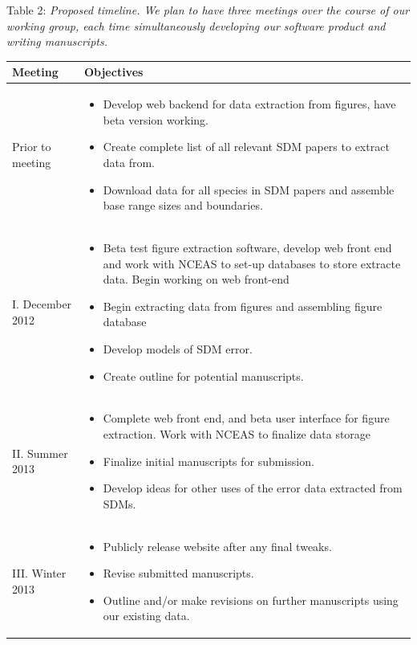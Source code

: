 \documentclass[pdftex,11pt,a4paper]{article}\usepackage{graphicx, color}
\begin{document}
Table 2: \textit{Proposed timeline.  We plan to have three meetings over the course of our working group, each time simultaneously developing our software product and writing manuscripts.}
\begin{center}
    \begin{tabularx}{\linewidth}{ | l | X |}
    \hline
    \textbf{Meeting} & \textbf{Objectives} \\ \hline
    
    Prior to meeting &
    \begin{itemize}
      \item Develop web backend for data extraction from figures, have beta version working.
      \item Create complete list of all relevant SDM papers to extract data from.
      \item Download data for all species in SDM papers and assemble base range sizes and boundaries.
    \end{itemize} \\ \hline
     
     I. December 2012 & 
     \begin{itemize}
      \item Beta test figure extraction software, develop web front end and work with NCEAS to set-up databases to store extracte data.  Begin working on web front-end
      \item Begin extracting data from figures and assembling figure database
      \item Develop models of SDM error.
      \item Create outline for potential manuscripts.
     \end{itemize}
  \\ \hline
       II. Summer 2013 & 
     \begin{itemize}
      \item Complete web front end, and beta user interface for figure extraction.  Work with NCEAS to finalize data storage
      \item Finalize initial manuscripts for submission.
      \item Develop ideas for other uses of the error data extracted from SDMs.
     \end{itemize}
  \\ \hline
       III. Winter 2013 & 
     \begin{itemize}
      \item Publicly release website after any final tweaks.
      \item Revise submitted manuscripts.
      \item Outline and/or make revisions on further manuscripts using our existing data.
     \end{itemize}
  \\ \hline
  \end{tabularx}
\end{center}



\end{document}

